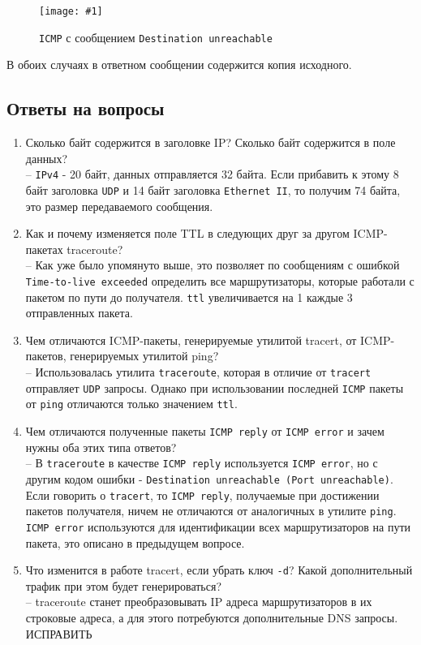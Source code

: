 \documentclass[12pt, a4paper]{article}
\newcommand{\figc}[4]{
  \begin{figure}[H]
  \begin{center}
    \texttt{[image: \#1]}
    \caption{#2}
    \label{fig:#3}
  \end{center}
  \end{figure}
}
\begin{document}
\figc{icmp_dest_unreach}{\texttt{ICMP} с сообщением \texttt{Destination unreachable}}{i_d_u}{3.0}

В обоих случаях в ответном сообщении содержится копия исходного.

\subsection{Ответы на вопросы}

\begin{enumerate}
  \item Сколько байт содержится в заголовке IP? Сколько байт содержится в поле данных?\\
    -- \texttt{IPv4} - 20 байт, данных отправляется 32 байта. Если прибавить к
    этому 8 байт заголовка \texttt{UDP} и 14 байт заголовка \texttt{Ethernet II},
    то получим 74 байта, это размер передаваемого сообщения.
  \item Как и почему изменяется поле TTL в следующих друг за другом ICMP-пакетах traceroute?\\
    -- Как уже было упомянуто выше, это позволяет по сообщениям с ошибкой
    \texttt{Time-to-live exceeded} определить все маршрутизаторы, которые
    работали с пакетом по пути до получателя. \texttt{ttl} увеличивается на 1
    каждые 3 отправленных пакета.
  \item  Чем отличаются ICMP-пакеты, генерируемые утилитой tracert, от
    ICMP-пакетов, генерируемых утилитой ping?\\
    -- Использовалась утилита \texttt{traceroute}, которая в отличие от
    \texttt{tracert} отправляет \texttt{UDP} запросы. Однако при использовании
    последней \texttt{ICMP} пакеты от \texttt{ping} отличаются только значением
    \texttt{ttl}.
  \item Чем отличаются полученные пакеты \texttt{ICMP reply} от \texttt{ICMP error} и зачем
    нужны оба этих типа ответов?\\
    -- В \texttt{traceroute} в качестве \texttt{ICMP reply} используется
    \texttt{ICMP error}, но с другим кодом ошибки - \texttt{Destination unreachable (Port unreachable)}.
    Если говорить о \texttt{tracert}, то \texttt{ICMP reply}, получаемые при
    достижении пакетов получателя, ничем не отличаются от аналогичных в утилите
    \texttt{ping}. \texttt{ICMP error} используются для идентификации всех
    маршрутизаторов на пути пакета, это описано в предыдущем вопросе.
  \item Что изменится в работе tracert, если убрать ключ \texttt{-d}? Какой
    дополнительный трафик при этом будет генерироваться?\\
    -- traceroute станет преобразовывать IP адреса маршрутизаторов в их строковые
    адреса, а для этого потребуются дополнительные DNS запросы. ИСПРАВИТЬ
\end{enumerate}
\end{document}
